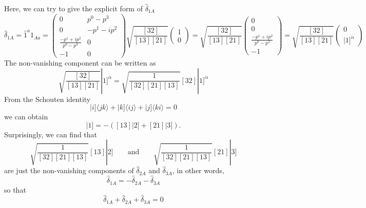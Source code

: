 \documentclass[12pt]{article}
\newcommand{\sket}[1]{|#1]}
\begin{document}
Here, we can try to give the explicit form of $\hat{\delta}_{1A}$
\begin{equation}
    \hat{\delta}_{1A}=\hat{1}^a 1_{Aa}=\begin{pmatrix}
        0 & p^0-p^3\\
        0 & -p^1-ip^2\\
        \frac{-p^1+ip^2}{p^0-p^3} & 0\\
        -1 & 0
    \end{pmatrix}\sqrt{\frac{[32]}{[13][21]}}\begin{pmatrix}
        1\\
        0
    \end{pmatrix}=\sqrt{\frac{[32]}{[13][21]}}\begin{pmatrix}
        0\\
        0\\
        \frac{-p^1+ip^2}{p^0-p^3}\\
        -1
    \end{pmatrix}=\sqrt{\frac{[32]}{[13][21]}}\begin{pmatrix}
        0\\
        \sket{1}^{\dot{\alpha}}
    \end{pmatrix}
\end{equation}
The non-vanishing component can be written as 
\begin{equation}
    \sqrt{\frac{[32]}{[13][21]}}\sket{1}^{\dot{\alpha}}=\sqrt{\frac{1}{[32][21][13]}}[32]\sket{1}^{\dot{\alpha}}
\end{equation}
From the Schouten identity
\begin{equation}
    \sket{i}\langle jk \rangle+\sket{k}\langle ij \rangle+\sket{j}\langle ki \rangle=0
\end{equation}
we can obtain
\begin{equation}
    [32]\sket{1}=-([13]\sket{2}+[21]\sket{3}).
\end{equation}
Surprisingly, we can find that 
\begin{equation}
    \sqrt{\frac{1}{[32][21][13]}}[13]\sket{2} \qquad \text{and} \qquad  \sqrt{\frac{1}{[32][21][13]}}[21]\sket{3} 
\end{equation}
are just the non-vanishing components of $\hat{\delta}_{2A}$ and $\hat{\delta}_{3A}$, in other words, 
\begin{equation}
    \hat{\delta}_{1A}=-\hat{\delta}_{2A}-\hat{\delta}_{3A}
\end{equation}
so that
\begin{equation}
    \hat{\delta}_{1A}+\hat{\delta}_{2A}+\hat{\delta}_{3A}=0
\end{equation}
\end{document}
